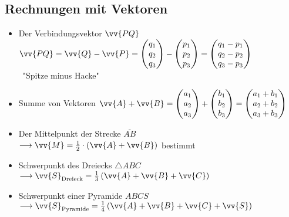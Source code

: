 \documentclass[a4paper,twocolumn,10pt]{onepgnote1}
\renewcommand\mynote{\notebox{Hinweis:}\ }
\begin{document}
\subsection{Rechnungen mit Vektoren}
\begin{itemize}
\item Der Verbindungsvektor $\vv{PQ}$ \\ $\vv{PQ} = \vv{Q} - \vv{P} = \begin{pmatrix} q_1 \\ q_2 \\ q_3 \end{pmatrix} - \begin{pmatrix} p_1 \\ p_2 \\ p_3 \end{pmatrix} = \begin{pmatrix} q_1 - p_1\\ q_2 - p_2\\ q_3 - p_3\end{pmatrix}$ \\ \mynote "Spitze minus Hacke"
\item Summe von Vektoren $\vv{A} +\vv{B} =  \begin{pmatrix} a_1 \\ a_2 \\ a_3 \end{pmatrix} + \begin{pmatrix} b_1 \\ b_2 \\ b_3 \end{pmatrix} = \begin{pmatrix} a_1 + b_1\\ a_2 + b_2\\ a_3 + b_3\end{pmatrix}$
\item Der Mittelpunkt der Strecke $\overline{AB}$  \\$ \longrightarrow \vv{M} = \frac{1}{2}\cdot \left(\vv{A} + \vv{B}\right)$ bestimmt 
\item Schwerpunkt des Dreiecks $\triangle ABC $\\ $\longrightarrow \vv{S}_{\text{Dreieck}} = \frac{1}{3} \left(\vv{A} + \vv{B} +\vv{C}\right)$
\item Schwerpunkt einer Pyramide $ABCS$ \\ $\longrightarrow \vv{S}_{\text{Pyramide}}= \frac{1}{4} \left(\vv{A} + \vv{B} +\vv{C} +\vv{S}\right)$
\end{itemize}
\end{document}

